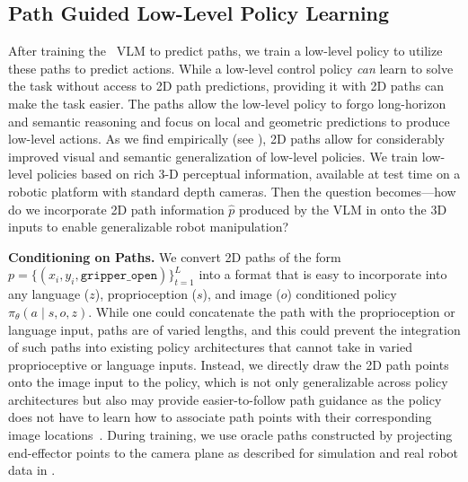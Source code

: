 \subsection{Path Guided Low-Level Policy Learning}
\label{sec:method:policy}
After training the \method\ VLM to predict paths, we train a low-level policy to utilize these paths to predict actions. While a low-level control policy \emph{can} learn to solve the task without access to 2D path predictions, providing it with 2D paths can make the task easier. The paths allow the low-level policy to forgo long-horizon and semantic reasoning and focus on local and geometric predictions to produce low-level actions. As we find empirically (see ), 2D paths allow for considerably improved visual and semantic generalization of low-level policies. We train low-level policies based on rich 3-D perceptual information, available at test time on a robotic platform with standard depth cameras. Then the question becomes---how do we incorporate 2D path information $\hat{p}$ produced by the VLM in  onto the 3D inputs to enable generalizable robot manipulation? 

\textbf{Conditioning on Paths.}
We convert 2D paths of the form $p = \{(x_i, y_i, \texttt{gripper\_open})\}_{t=1}^L$ into a format that is easy to incorporate into any language ($z$), proprioception ($s$), and image ($o$) conditioned policy $\pi_\theta(a \mid s, o, z)$.
While one could concatenate the path with the proprioception or language input, paths are of varied lengths, and this could prevent the integration of such paths into existing policy architectures that cannot take in varied proprioceptive or language inputs. Instead, we directly draw the 2D path points onto the image input to the policy, which is not only generalizable across policy architectures but also may provide easier-to-follow path guidance as the policy does not have to learn how to associate path points with their corresponding image locations~\citep{gu2023rttrajectory}. 
During training, we use oracle paths constructed by projecting end-effector points to the camera plane as described for simulation and real robot data in .

